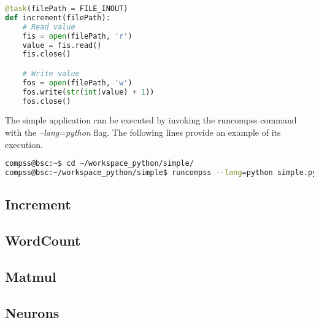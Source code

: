 \begin{lstlisting}[language=python]
@task(filePath = FILE_INOUT)
def increment(filePath):
    # Read value
    fis = open(filePath, 'r')
    value = fis.read()
    fis.close()

    # Write value
    fos = open(filePath, 'w')
    fos.write(str(int(value) + 1))
    fos.close()
\end{lstlisting}

The simple application can be executed by invoking the runcompss command with the \textit{--lang=python} flag. The following lines provide
an example of its execution.

\begin{lstlisting}[language=bash]
compss@bsc:~$ cd ~/workspace_python/simple/
compss@bsc:~/workspace_python/simple$ runcompss --lang=python simple.py 1
\end{lstlisting}


\subsection{Increment}

\subsection{WordCount}

\subsection{Matmul}

\subsection{Neurons}
